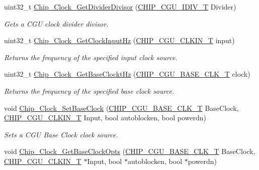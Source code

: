 \begin{DoxyCompactItemize}
uint32\+\_\+t \hyperlink{group___c_l_o_c_k__18_x_x__43_x_x_gaeecd015038258f1cc4f746054268d94f}{Chip\+\_\+\+Clock\+\_\+\+Get\+Divider\+Divisor} (\hyperlink{chip__clocks_8h_a588e8716294cc2deec5d583add455521}{C\+H\+I\+P\+\_\+\+C\+G\+U\+\_\+\+I\+D\+I\+V\+\_\+T} Divider)
\begin{DoxyCompactList}\small\item\em Gets a C\+GU clock divider divisor. \end{DoxyCompactList}\item 
uint32\+\_\+t \hyperlink{group___c_l_o_c_k__18_x_x__43_x_x_ga4ad0a2b922ac85f94ab0bb2036def308}{Chip\+\_\+\+Clock\+\_\+\+Get\+Clock\+Input\+Hz} (\hyperlink{group___c_l_o_c_k__18_x_x__43_x_x_ga0975326707efebf2b074283e6c602f18}{C\+H\+I\+P\+\_\+\+C\+G\+U\+\_\+\+C\+L\+K\+I\+N\+\_\+T} input)
\begin{DoxyCompactList}\small\item\em Returns the frequency of the specified input clock source. \end{DoxyCompactList}\item 
uint32\+\_\+t \hyperlink{group___c_l_o_c_k__18_x_x__43_x_x_ga8686b03c1433974a6473f10cc0203915}{Chip\+\_\+\+Clock\+\_\+\+Get\+Base\+Clockt\+Hz} (\hyperlink{chip__clocks_8h_a31e266dd83cc66eb866d8d051ffd1d45}{C\+H\+I\+P\+\_\+\+C\+G\+U\+\_\+\+B\+A\+S\+E\+\_\+\+C\+L\+K\+\_\+T} clock)
\begin{DoxyCompactList}\small\item\em Returns the frequency of the specified base clock source. \end{DoxyCompactList}\item 
void \hyperlink{group___c_l_o_c_k__18_x_x__43_x_x_gaf5e0d6f4dcbfd5ff64b1ddcd37067ca2}{Chip\+\_\+\+Clock\+\_\+\+Set\+Base\+Clock} (\hyperlink{chip__clocks_8h_a31e266dd83cc66eb866d8d051ffd1d45}{C\+H\+I\+P\+\_\+\+C\+G\+U\+\_\+\+B\+A\+S\+E\+\_\+\+C\+L\+K\+\_\+T} Base\+Clock, \hyperlink{group___c_l_o_c_k__18_x_x__43_x_x_ga0975326707efebf2b074283e6c602f18}{C\+H\+I\+P\+\_\+\+C\+G\+U\+\_\+\+C\+L\+K\+I\+N\+\_\+T} Input, bool autoblocken, bool powerdn)
\begin{DoxyCompactList}\small\item\em Sets a C\+GU Base Clock clock source. \end{DoxyCompactList}\item 
void \hyperlink{group___c_l_o_c_k__18_x_x__43_x_x_ga9d6621765b2b77f40db1eed937cb5dc8}{Chip\+\_\+\+Clock\+\_\+\+Get\+Base\+Clock\+Opts} (\hyperlink{chip__clocks_8h_a31e266dd83cc66eb866d8d051ffd1d45}{C\+H\+I\+P\+\_\+\+C\+G\+U\+\_\+\+B\+A\+S\+E\+\_\+\+C\+L\+K\+\_\+T} Base\+Clock, \hyperlink{group___c_l_o_c_k__18_x_x__43_x_x_ga0975326707efebf2b074283e6c602f18}{C\+H\+I\+P\+\_\+\+C\+G\+U\+\_\+\+C\+L\+K\+I\+N\+\_\+T} $\ast$Input, bool $\ast$autoblocken, bool $\ast$powerdn)

\end{DoxyCompactItemize}
